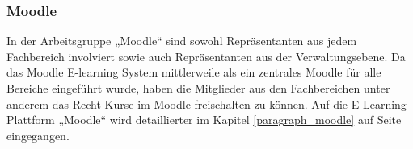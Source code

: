 \subsubsection{Moodle}
\label{subsubsection_zustaendigkeiten_moodle}
In der Arbeitsgruppe „Moodle“ sind sowohl Repräsentanten aus jedem Fachbereich involviert sowie auch Repräsentanten aus der Verwaltungsebene. Da das Moodle E-learning System mittlerweile als ein zentrales Moodle für alle Bereiche eingeführt wurde, haben die Mitglieder aus den Fachbereichen unter anderem das Recht Kurse im Moodle freischalten zu können. Auf die E-Learning Plattform „Moodle“ wird detaillierter im Kapitel \ref{paragraph_moodle} auf Seite \pageref{paragraph_moodle} eingegangen.
